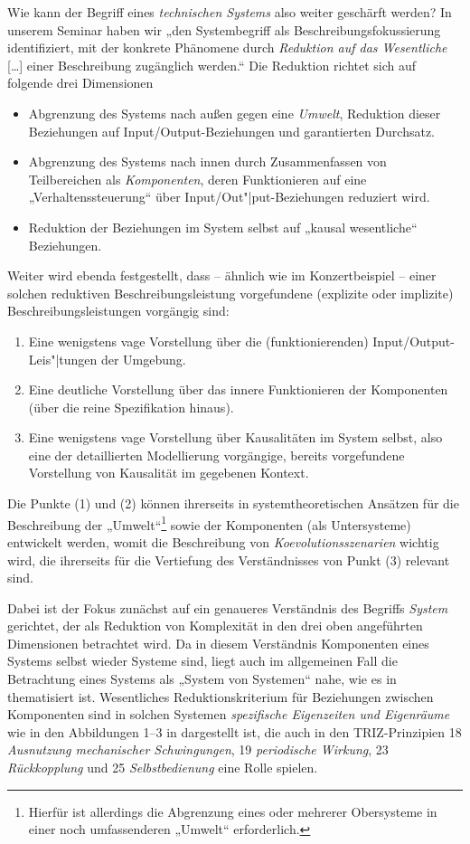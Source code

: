 \documentclass[12pt,a4paper]{article}
\begin{document}
Wie kann der Begriff eines \emph{technischen Systems} also weiter geschärft
werden?  In unserem Seminar \cite{Graebe2020} haben wir „den Systembegriff als
Beschreibungsfokussierung identifiziert, mit der konkrete Phänomene durch
\emph{Reduktion auf das Wesentliche} [\ldots] einer Beschreibung zugänglich
werden.“  Die Reduktion richtet sich auf folgende drei Dimensionen
\cite[S. 18]{Graebe2020} 
\begin{itemize}
\item [(1)] Abgrenzung des Systems nach außen gegen eine \emph{Umwelt},
  Reduktion dieser Beziehungen auf Input/Output-Beziehungen und garantierten
  Durchsatz.
\item [(2)] Abgrenzung des Systems nach innen durch Zusammenfassen von
  Teilbereichen als \emph{Komponenten}, deren Funktionieren auf eine
  „Verhaltenssteuerung“ über Input/Out"|put-Beziehungen reduziert wird.
\item [(3)] Reduktion der Beziehungen im System selbst auf „kausal
  wesentliche“ Beziehungen.
\end{itemize}
Weiter wird ebenda festgestellt, dass -- ähnlich wie im Konzertbeispiel --
einer solchen reduktiven Beschreibungsleistung vorgefundene (explizite oder
implizite) Beschreibungsleistungen vorgängig sind:
\begin{enumerate}
\item[(1)] Eine wenigstens vage Vorstellung über die (funktionierenden)
  Input/Output-Leis"|tungen der Umgebung.
\item[(2)] Eine deutliche Vorstellung über das innere Funktionieren der
  Komponenten (über die reine Spezifikation hinaus).
\item[(3)] Eine wenigstens vage Vorstellung über Kausalitäten im System
  selbst, also eine der detaillierten Modellierung vorgängige, bereits
  vorgefundene Vorstellung von Kausalität im gegebenen Kontext.
\end{enumerate}
Die Punkte (1) und (2) können ihrerseits in systemtheoretischen Ansätzen für
die Beschreibung der „Umwelt“\footnote{Hierfür ist allerdings die Abgrenzung
  eines oder mehrerer Obersysteme in einer noch umfassenderen „Umwelt“
  erforderlich.}  sowie der Komponenten (als Untersysteme) entwickelt werden,
womit die Beschreibung von \emph{Koevolutionsszenarien} wichtig wird, die
ihrerseits für die Vertiefung des Verständnisses von Punkt (3) relevant sind.

Dabei ist der Fokus zunächst auf ein genaueres Verständnis des Begriffs
\emph{System} gerichtet, der als Reduktion von Komplexität in den drei oben
angeführten Dimensionen betrachtet wird. Da in diesem Verständnis Komponenten
eines Systems selbst wieder Systeme sind, liegt auch im allgemeinen Fall die
Betrachtung eines Systems als „System von Systemen“ nahe, wie es in
\cite{Holling2000} thematisiert ist.  Wesentliches Reduktionskriterium für
Beziehungen zwischen Komponenten sind in solchen Systemen \emph{spezifische
  Eigenzeiten und Eigenräume} wie in den Abbildungen 1--3 in
\cite{Holling2000} dargestellt ist, die auch in den TRIZ-Prinzipien 18
\emph{Ausnutzung mechanischer Schwingungen}, 19 \emph{periodische Wirkung}, 23
\emph{Rückkopplung} und 25 \emph{Selbstbedienung} eine Rolle spielen.
\end{document}
